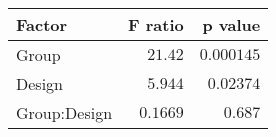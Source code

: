 \begin{tabular}{lrr}
\toprule
       Factor &  F ratio &    p value \\
\midrule
        Group &  $21.42$ & $0.000145$ \\
       Design &  $5.944$ &  $0.02374$ \\
 Group:Design & $0.1669$ &    $0.687$ \\
\bottomrule
\end{tabular}
